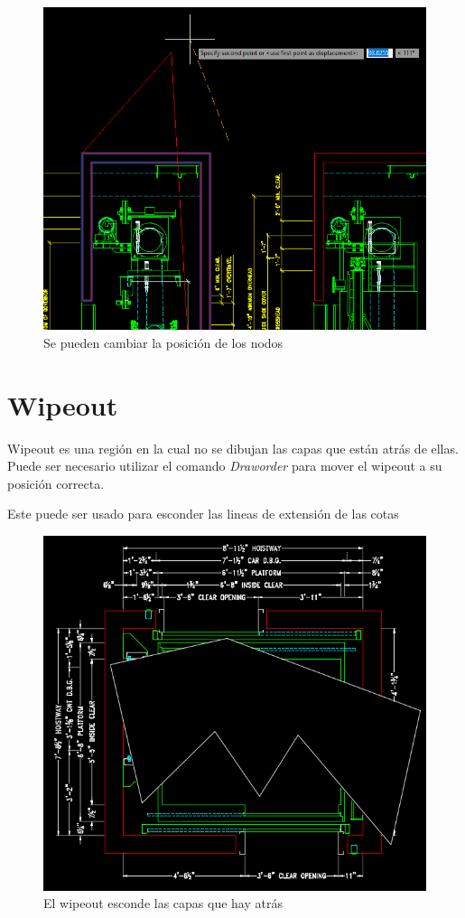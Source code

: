 \documentclass[12pt,letterpaper,final]{report}
\begin{document}
\begin{figure}[H]
	\centering
	\includegraphics[width=0.85\linewidth, height=0.5\textheight,keepaspectratio]{Imagenes/autocad_stretch03}
	\caption{Se pueden cambiar la posición de los nodos}
	\label{fig:autocadstretch03}
\end{figure}

\chapter{Wipeout}

Wipeout es una región en la cual no se dibujan las capas que están atrás de ellas. Puede ser necesario utilizar el comando \emph{Draworder} para mover el wipeout a su posición correcta.

Este puede ser usado para esconder las lineas de extensión de las cotas

\begin{figure}[H]
	\centering
	\includegraphics[width=0.65\linewidth, height=0.5\textheight,keepaspectratio]{Imagenes/autocad_wipeout_01}
	\caption{El wipeout esconde las capas que hay atrás}
	\label{fig:autocadwipeout01}
\end{figure}
\end{document}
